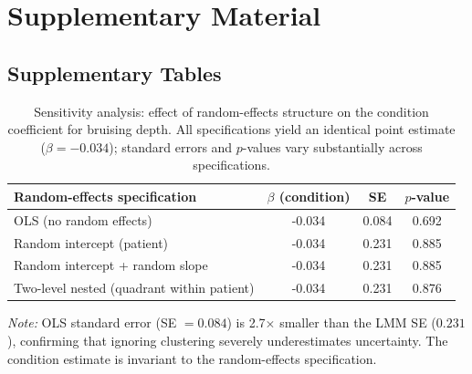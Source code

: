 \clearpage
\appendix
\setcounter{table}{0}
\renewcommand{\thetable}{S\arabic{table}}
\setcounter{figure}{0}
\renewcommand{\thefigure}{S\arabic{figure}}

\section*{Supplementary Material}

\subsection*{Supplementary Tables}

\begin{table}[htbp]
\centering
\caption{Sensitivity analysis: effect of random-effects structure on the condition coefficient for bruising depth. All specifications yield an identical point estimate ($\beta = -0.034$); standard errors and $p$-values vary substantially across specifications.}
\label{tab:supp-sensitivity}
\begin{tabular}{l S[table-format=-1.3] S[table-format=1.3] S[table-format=1.3]}
\toprule
{Random-effects specification} & {$\beta$ (condition)} & {SE} & {$p$-value} \\
\midrule
OLS (no random effects)                   & -0.034 & 0.084 & 0.692 \\
Random intercept (patient)                & -0.034 & 0.231 & 0.885 \\
Random intercept + random slope           & -0.034 & 0.231 & 0.885 \\
Two-level nested (quadrant within patient)& -0.034 & 0.231 & 0.876 \\
\bottomrule
\end{tabular}
\smallskip

\noindent\textit{Note:} OLS standard error (SE $= 0.084$) is 2.7$\times$ smaller than the LMM SE ($0.231$), confirming that ignoring clustering severely underestimates uncertainty. The condition estimate is invariant to the random-effects specification.
\end{table}

